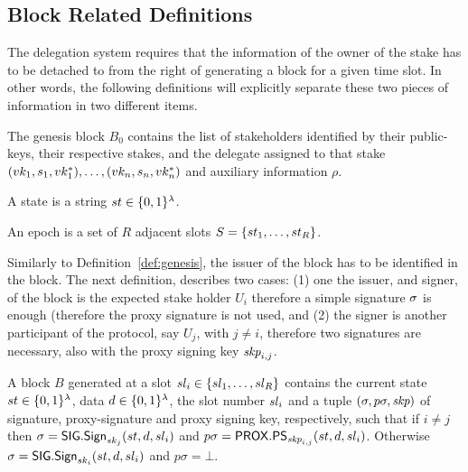 \subsection{Block Related Definitions}

The delegation system requires that the information of the owner of the stake has to be detached to from the right of generating a block for a given time slot. In other words, the following definitions will explicitly separate these two pieces of information in two different items.

\begin{definition}\label{def:genesis}
The genesis block $B_{0}$ contains the list of stakeholders identified by their public-keys, their respective stakes, and the delegate assigned to that stake $(vk_{1},s_{1},vk^\ast_{1}),\dots,(vk_{n},s_{n},vk^\ast_{n})$ and auxiliary information $\rho$.
\end{definition}


\begin{definition}[State]
A state is a string $st\in\{0,1\}^\lambda$.
\end{definition}

\begin{definition}[Epoch]
An epoch is a set of $R$ adjacent slots $S=\{st_{1},\dots,st_{R}\}$.
\end{definition}

Similarly to Definition~\ref{def:genesis}, the issuer of the block has to be identified in the block. The next definition, describes two cases: (1) one the issuer, and signer, of the block is the expected stake holder $U_{i}$ therefore a simple signature $\sigma$ is enough (therefore the proxy signature is not used, and (2) the signer is another participant of the protocol, say $U_{j}$, with $j\neq i$, therefore two signatures are necessary, also with the proxy signing key $\textit{skp}_{i,j}$.
\begin{definition}[Block]
A block $B$ generated at a slot $sl_{i}\in\{sl_{1},\dots,sl_{R}\}$ contains the current state $st\in\{0,1\}^\lambda$, data $d\in\{0,1\}^\lambda$, the slot number $sl_{i}$ and a tuple $(\sigma,p\sigma, \textit{skp})$ of signature, proxy-signature and proxy signing key, respectively, such that if $i\neq j$ then $\sigma=\mathsf{SIG}.\mathsf{Sign}_{sk_{j}}(st,d,sl_{i})$ and $p\sigma=\mathsf{PROX}.\mathsf{PS}_{\textit{skp}_{i,j}}(st,d,sl_{i})$. Otherwise $\sigma=\mathsf{SIG}.\mathsf{Sign}_{sk_{i}}(st,d,sl_{i})$ and $p\sigma=\bot$.
\end{definition}